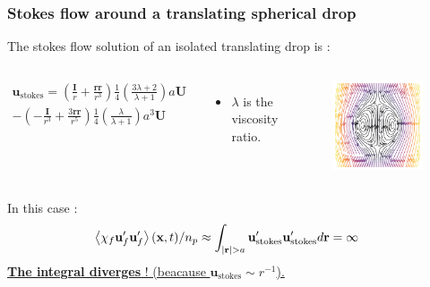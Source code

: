 \documentclass{sintefbeamer}
\begin{document}
\begin{frame}
  \frametitle{Stokes flow around a translating spherical drop}
  The stokes flow solution of an isolated translating drop is :
  \begin{columns}
  \begin{multline*}
    \textbf{u}_\text{stokes} 
    = \left(\frac{ \textbf{I}}{r} + \frac{\textbf{rr}}{r^3}\right)  \frac{1}{4}\left(\frac{3\lambda + 2}{\lambda +1}\right) a \textbf{U}\\
    - \left(-\frac{\textbf{I}}{r^3} + \frac{3 \textbf{rr} }{r^5}\right)  \frac{1}{4}\left(\frac{\lambda}{\lambda +1}\right) a^3 \textbf{U}
  \end{multline*}
  \begin{itemize}
      \item $\lambda$ is the viscosity ratio.
  \end{itemize}
  \begin{figure}
    \includegraphics[width=\textwidth]{image/Rising_Stokes.png}
  \end{figure}
  \end{columns}
\pause
  In this case : 
  \begin{align*}
    \left<\chi_f \textbf{u}'_f\textbf{u}'_f\right>(\textbf{x},t) / n_p
    &\approx 
    \int_{|\textbf{r}| > a} \textbf{u}'_\text{stokes}\textbf{u}'_\text{stokes}   d\textbf{r}
    =\infty 
  \end{align*}
  \underline{\textbf{The integral diverges}  ! (beacause $\textbf{u}_\text{stokes} \sim r^{-1}$).}



\end{frame}
\end{document}

